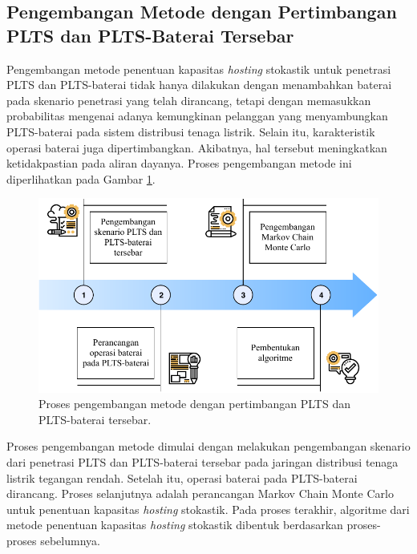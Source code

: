 {\subsection{Pengembangan Metode dengan Pertimbangan PLTS dan PLTS-Baterai Tersebar}
Pengembangan metode penentuan kapasitas \textit{\textit{hosting}} stokastik untuk penetrasi PLTS dan PLTS-baterai tidak hanya dilakukan dengan menambahkan baterai pada skenario penetrasi yang telah dirancang, tetapi dengan memasukkan probabilitas mengenai adanya kemungkinan pelanggan yang menyambungkan PLTS-baterai pada sistem distribusi tenaga listrik. Selain itu, karakteristik operasi baterai juga dipertimbangkan. Akibatnya, hal tersebut meningkatkan ketidakpastian pada aliran dayanya. Proses pengembangan metode ini diperlihatkan pada Gambar \ref{stage3}.
\begin{figure}[!h]
	\centering
	\includegraphics[width=1\textwidth]{Fig/stage3}
	\caption{Proses pengembangan metode dengan pertimbangan PLTS dan PLTS-baterai tersebar.}
	\label{stage3}
\end{figure}

Proses pengembangan metode dimulai dengan melakukan pengembangan skenario dari penetrasi PLTS dan PLTS-baterai tersebar pada jaringan distribusi tenaga listrik tegangan rendah. Setelah itu, operasi baterai pada PLTS-baterai dirancang. Proses selanjutnya adalah perancangan Markov Chain Monte Carlo untuk penentuan kapasitas \textit{\textit{hosting}} stokastik. Pada proses terakhir, algoritme dari metode penentuan kapasitas \textit{\textit{hosting}} stokastik dibentuk berdasarkan proses-proses sebelumnya. 

}
